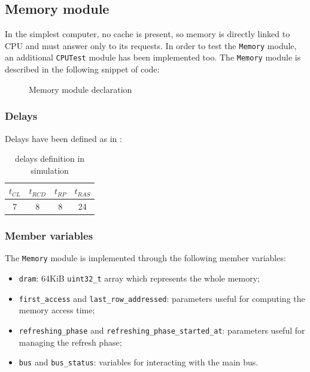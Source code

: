 \documentclass[a4paper,12pt]{article}
\begin{document}
\subsection{Memory module}
In the simplest computer, no cache is present, so memory is directly linked to CPU and must answer only to its requests.
In order to test the \texttt{Memory} module, an additional \texttt{CPUTest} module has been implemented too.
The \texttt{Memory} module is described in the following snippet of code:

\begin{figure}[H]

\caption{Memory module declaration}
\label{src:memory-h}
\end{figure}

\subsubsection{Delays}
Delays have been defined as in \cite{bib:spectek}:

\begin{table}[H]
\centering
\bgroup
\def\arraystretch{1.5}  %
\begin{tabular}{| c | c | c | c |}\hline
$t_{CL}$ & $t_{RCD}$ & $t_{RP}$ & $t_{RAS}$ \\ \hline
7 & 8 & 8 & 24 \\ \hline
\end{tabular}
\egroup
\caption{delays definition in simulation}
\end{table}

\subsubsection{Member variables}
The \texttt{Memory} module is implemented through the following member variables:

\begin{itemize}
    \item \texttt{dram}: 64KiB \texttt{uint32\_t} array which represents the whole memory;
    \item \texttt{first\_access} and \texttt{last\_row\_addressed}: parameters useful for computing the memory access time;
    \item \texttt{refreshing\_phase} and \texttt{refreshing\_phase\_started\_at}: parameters useful for managing the refresh phase;
    \item \texttt{bus} and \texttt{bus\_status}: variables for interacting with the main bus.
\end{itemize}
\end{document}

